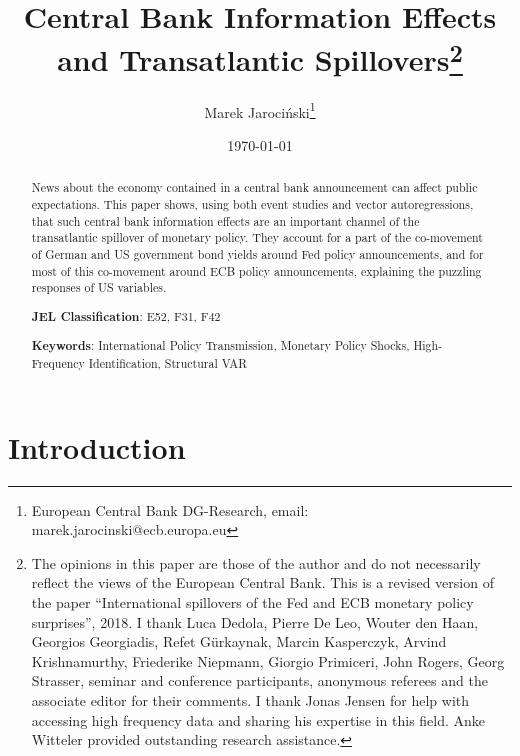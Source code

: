 \documentclass[a4paper,12pt]{article}
\begin{document}

\author{Marek Jaroci\'nski\thanks{%
European Central Bank DG-Research, email: marek.jarocinski@ecb.europa.eu}}
\title{Central Bank Information Effects and Transatlantic Spillovers\thanks{%
The opinions in this paper are
those of the author and do not necessarily reflect the views of the
European Central Bank.
This is a revised version of the paper ``International spillovers of the Fed and ECB monetary policy surprises'', 2018. I thank Luca Dedola, Pierre De Leo, Wouter den Haan, Georgios Georgiadis, Refet G\"urkaynak, Marcin Kasperczyk, Arvind Krishnamurthy, Friederike Niepmann, Giorgio Primiceri, John Rogers, Georg Strasser, seminar and conference participants, anonymous referees and the associate editor for their comments. I thank Jonas Jensen for help with accessing high frequency data and sharing his expertise in this field. Anke Witteler provided outstanding research assistance.}}
\date{\today}
\maketitle

\begin{abstract}
News about the economy contained in a central bank announcement can affect public expectations. This paper shows, using both event studies and vector autoregressions, that such central bank information effects are an important channel of the transatlantic spillover of monetary policy. They account for a part of the co-movement of German and US government bond yields around Fed policy announcements, and for most of this co-movement around ECB policy announcements, explaining the puzzling responses of US variables.

\bigskip

\noindent \textbf{JEL Classification}: E52, F31, F42

\noindent \textbf{Keywords}: International Policy Transmission, Monetary Policy Shocks, High-Frequency Identification, Structural VAR
\end{abstract}


\pagebreak

\setcounter{page}{1}

\section{Introduction}
\end{document}
